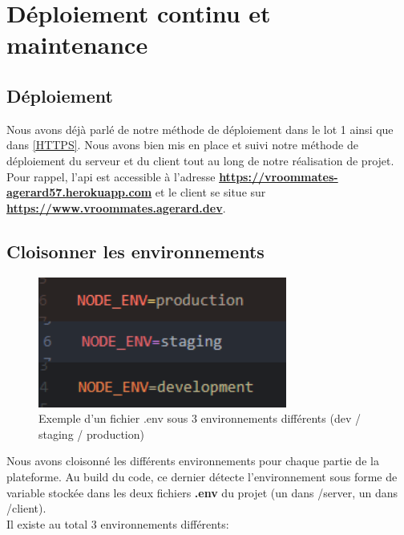 \section{Déploiement continu et maintenance}

\subsection{Déploiement}

Nous avons déjà parlé de notre méthode de déploiement dans le lot 1 ainsi que dans \ref{HTTPS}. Nous avons bien mis en place et suivi notre méthode de déploiement du serveur et du client tout au long de notre réalisation de projet.
Pour rappel, l'api est accessible à l'adresse \textbf{\href{https://vroommates-agerard57.herokuapp.com}{https://vroommates-agerard57.herokuapp.com}} et le client se situe sur  \textbf{\href{https://www.vroommates.agerard.dev}{https://www.vroommates.agerard.dev}}. 

\subsection{Cloisonner les environnements}

\begin{figure}[th]
\centering
\includegraphics{medias/envExample.png}
\decoRule
\caption{Exemple d'un fichier .env sous 3 environnements différents (dev / staging / production)}
\end{figure}

Nous avons cloisonné les différents environnements pour chaque partie de la plateforme. Au build du code, ce dernier détecte l'environnement sous forme de variable stockée dans les deux fichiers \textbf{.env} du projet (un dans /server, un dans /client).\\
Il existe au total 3 environnements différents:

